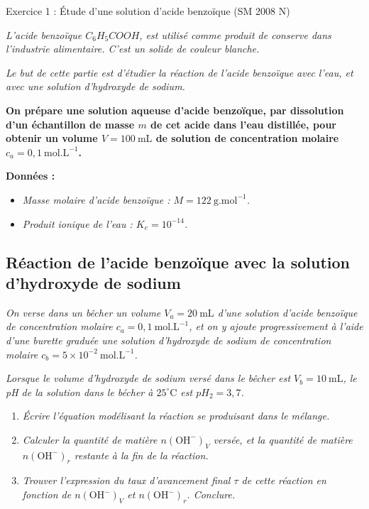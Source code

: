 \documentclass[12pt, french]{article}
\begin{document}
\begin{center}

\end{center}

\vspace{-0.2cm}
   \begin{Box2}{Exercice 1 : Étude d’une solution d’acide benzoïque (SM 2008 N) }


\emph{L’acide benzoïque $C_6H_5COOH$, est utilisé comme produit de conserve dans l’industrie alimentaire. C’est un solide de couleur blanche.}

\emph{Le but de cette partie est d’étudier la réaction de l’acide benzoïque avec l’eau, et avec une solution d’hydroxyde de sodium.}

\textbf{On prépare une solution aqueuse d’acide benzoïque, par dissolution d’un échantillon de masse $m$ de cet acide dans l’eau distillée, pour obtenir un volume $V = 100\ \text{mL}$ de solution de concentration molaire $c_a = 0,1\ \text{mol.L}^{-1}$.}

\textbf{Données :}
\begin{itemize}
    \item \emph{Masse molaire d’acide benzoïque : $M = 122\ \text{g.mol}^{-1}$.}
    \item \emph{Produit ionique de l’eau : $K_e = 10^{-14}$.}
\end{itemize}

\subsection*{Réaction de l’acide benzoïque avec la solution d’hydroxyde de sodium}

\emph{On verse dans un bêcher un volume $V_a = 20\ \text{mL}$ d’une solution d’acide benzoïque de concentration molaire $c_a = 0,1\ \text{mol.L}^{-1}$, et on y ajoute progressivement à l’aide d’une burette graduée une solution d’hydroxyde de sodium de concentration molaire $c_b = 5 \times 10^{-2}\ \text{mol.L}^{-1}$.}

\emph{Lorsque le volume d’hydroxyde de sodium versé dans le bêcher est $V_b = 10\ \text{mL}$, le pH de la solution dans le bécher à $25^\circ\text{C}$ est $pH_2 = 3,7$.}

\begin{enumerate}
    \item \emph{Écrire l’équation modélisant la réaction se produisant dans le mélange.}
    \item \emph{Calculer la quantité de matière $n(\text{OH}^-)_V$ versée, et la quantité de matière $n(\text{OH}^-)_r$ restante à la fin de la réaction.}
    \item \emph{Trouver l’expression du taux d’avancement final $\tau$ de cette réaction en fonction de $n(\text{OH}^-)_V$ et $n(\text{OH}^-)_r$. Conclure.}
\end{enumerate}



   \end{Box2}
\end{document}
